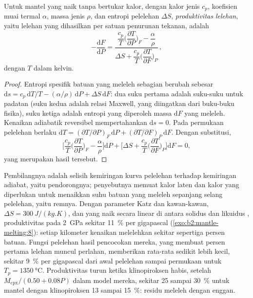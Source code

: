 \begin{proposition}\label{prop:b2:mantle-melting:productivity}
Untuk mantel yang naik tanpa bertukar kalor, dengan kalor jenis $c_p$, koefisien
muai termal $\alpha$, massa jenis $\rho$, dan entropi pelelehan $\Delta S$,
\emph{produktivitas lelehan}, yaitu lelehan yang dihasilkan per satuan penurunan
tekanan, adalah
\[
  -\frac{\mathrm dF}{\mathrm dP} =
  \frac{\dfrac{c_p}{T}\Big(\dfrac{\partial T}{\partial P}\Big)_F - \dfrac{\alpha}{\rho}}
       {\Delta S + \dfrac{c_p}{T}\Big(\dfrac{\partial T}{\partial F}\Big)_P}\,,
\]
dengan $T$ dalam kelvin.
\end{proposition}

\begin{proof}
Entropi spesifik batuan yang meleleh sebagian berubah sebesar $\mathrm ds = c_p\,
\mathrm dT/T - (\alpha/\rho)\,\mathrm dP + \Delta S\,\mathrm dF$: dua suku
pertama adalah suku-suku untuk padatan (suku kedua adalah relasi Maxwell, yang diingatkan dari
buku-buku fisika), suku ketiga adalah entropi yang diperoleh massa $\mathrm dF$ yang
meleleh. Kenaikan adiabatik reversibel mempertahankan $\mathrm ds = 0$. Pada permukaan
pelelehan berlaku $\mathrm dT = (\partial T/\partial P)_F\,\mathrm dP + (\partial
T/\partial F)_P\,\mathrm dF$. Dengan substitusi,
\[
  \Big[\frac{c_p}{T}\Big(\frac{\partial T}{\partial P}\Big)_F - \frac{\alpha}{\rho}\Big]\mathrm dP
  + \Big[\Delta S + \frac{c_p}{T}\Big(\frac{\partial T}{\partial F}\Big)_P\Big]\mathrm dF = 0,
\]
yang merupakan hasil tersebut.
\end{proof}

Pembilangnya adalah selisih kemiringan kurva pelelehan terhadap kemiringan adiabat, yaitu
pendorongnya; penyebutnya memuat kalor laten dan kalor yang diperlukan untuk menaikkan
suhu batuan yang meleleh sepanjang selang pelelehan, yaitu remnya. Dengan
parameter Katz dan kawan-kawan, $\Delta S = \qty{300}{J/(kg.K)}$, dan  yang naik secara linear di antara solidus dan likuidus ,
produktivitas pada \qty{2}{GPa} sekitar \qty{11}{\percent} per gigapascal
(\cref{exo:b2:mantle-melting:8}): setiap kilometer kenaikan melelehkan sekitar sepertiga persen
batuan. Fungsi pelelehan hasil pencocokan mereka, yang membuat persen pertama lelehan muncul
perlahan, memberikan rata-rata sedikit lebih kecil, sekitar \qty{9}{\percent} per gigapascal
dari awal pelelehan sampai permukaan untuk $T_p = \qty{1350}{\celsius}$. Produktivitas
turun ketika klinopiroksen habis, setelah 
$M_{\mathrm{cpx}}/(0.50 + 0.08P)$ dalam model mereka, sekitar 25 sampai \qty{30}{\percent} untuk
mantel dengan klinopiroksen 13 sampai \qty{15}{\percent}: residu  meleleh
dengan enggan.

